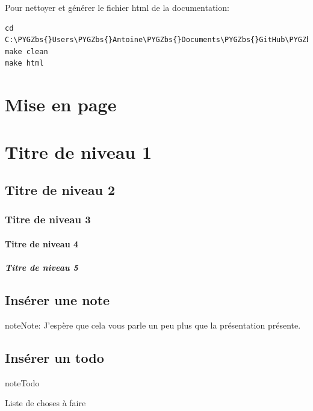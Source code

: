 \documentclass[letterpaper,10pt,english]{sphinxmanual}
\def\PYGZbs{\char`\\}
\def\PYGZus{\char`\_}
\begin{document}
Pour nettoyer et générer le fichier html de la documentation:

\begin{Verbatim}[commandchars=\\\{\}]
cd C:\PYGZbs{}Users\PYGZbs{}Antoine\PYGZbs{}Documents\PYGZbs{}GitHub\PYGZbs{}Solar\PYGZus{}mod\PYGZbs{}docs
make clean
make html
\end{Verbatim}


\section{Mise en page}
\label{sphinx:mise-en-page}

\section{Titre de niveau 1}
\label{sphinx:titre-de-niveau-1}

\subsection{Titre de niveau 2}
\label{sphinx:titre-de-niveau-2}

\subsubsection{Titre de niveau 3}
\label{sphinx:titre-de-niveau-3}

\paragraph{Titre de niveau 4}
\label{sphinx:titre-de-niveau-4}

\subparagraph{Titre de niveau 5}
\label{sphinx:titre-de-niveau-5}

\subsection{Insérer une note}
\label{sphinx:inserer-une-note}
\begin{notice}{note}{Note:}
J'espère que cela vous parle un peu plus que la présentation présente.
\end{notice}


\subsection{Insérer un todo}
\label{sphinx:inserer-un-todo}
\begin{notice}{note}{Todo}

Liste de choses à faire
\end{notice}
\end{document}
